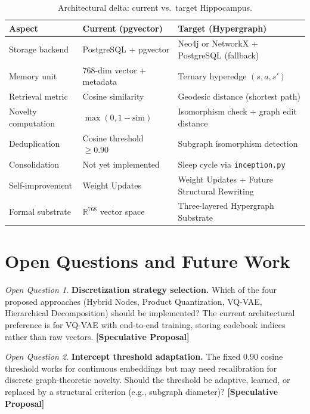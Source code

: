 \documentclass[11pt]{article}
\newcommand{\speculative}{\textcolor{speculativeorange}{\textbf{[Speculative Proposal]}}}
\theoremstyle{definition}
\theoremstyle{remark}
\newtheorem{openquestion}{Open Question}[section]
\begin{document}
\begin{table}[h]
	\centering
	\begin{tabular}{@{}p{4cm}p{5cm}p{5cm}@{}}
		\toprule
		\textbf{Aspect} & \textbf{Current (pgvector)} & \textbf{Target (Hypergraph)} \\
		\midrule
		Storage backend &
		PostgreSQL + pgvector &
		Neo4j or NetworkX + PostgreSQL (fallback) \\[0.5em]
		Memory unit &
		768-dim vector + metadata &
		Ternary hyperedge $(s, a, s')$ \\[0.5em]
		Retrieval metric &
		Cosine similarity &
		Geodesic distance (shortest path) \\[0.5em]
		Novelty computation &
		$\max(0, 1 - \text{sim})$ &
		Isomorphism check + graph edit distance \\[0.5em]
		Deduplication &
		Cosine threshold $\geq 0.90$ &
		Subgraph isomorphism detection \\[0.5em]
		Consolidation &
		Not yet implemented &
		Sleep cycle via \texttt{inception.py} \\[0.5em]
		Self-improvement &
		Weight Updates &
		Weight Updates + Future Structural Rewriting \\[0.5em]
		Formal substrate &
		$\mathbb{R}^{768}$ vector space &
		Three-layered Hypergraph Substrate\\
		\bottomrule
	\end{tabular}
	\caption{Architectural delta: current vs.\ target Hippocampus.}
	\label{tab:delta}
\end{table}

\newpage

\section{Open Questions and Future Work}
\label{sec:open}

\begin{openquestion}
\textbf{Discretization strategy selection.} Which of the four proposed
approaches (Hybrid Nodes, Product Quantization, VQ-VAE, Hierarchical
Decomposition) should be implemented? The current architectural preference
is for VQ-VAE with end-to-end training, storing codebook indices rather than
raw vectors. \speculative{}
\end{openquestion}

\begin{openquestion}
\textbf{Intercept threshold adaptation.} The fixed $0.90$ cosine threshold
works for continuous embeddings but may need recalibration for discrete
graph-theoretic novelty. Should the threshold be adaptive, learned, or
replaced by a structural criterion (e.g., subgraph diameter)? \speculative{}
\end{openquestion}
\end{document}
